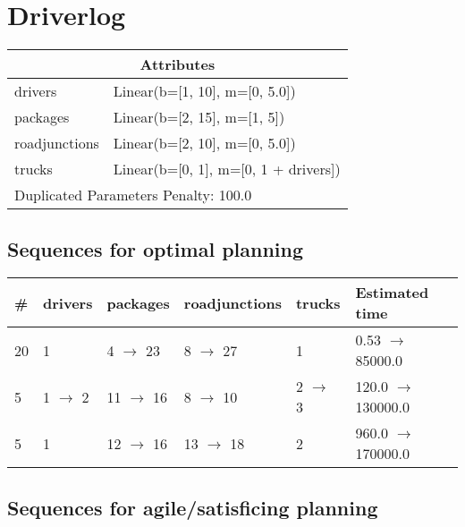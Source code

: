 \documentclass{article}
\begin{document}
                            \newpage \section{Driverlog}
                    \begin{center}
                    \begin{tabular}{@{}p{}p{}@{}}
                    \multicolumn{2}{c}{\bf \large Attributes}\\\midrule
                    drivers & Linear(b=[1, 10], m=[0, 5.0])\\
packages & Linear(b=[2, 15], m=[1, 5])\\
roadjunctions & Linear(b=[2, 10], m=[0, 5.0])\\
trucks & Linear(b=[0, 1], m=[0, 1 + drivers]) \\\midrule
                    \multicolumn{2}{l}{Duplicated Parameters Penalty: 100.0}
                    \end{tabular}
                    \end{center}
                
                            \subsection*{Sequences for optimal planning}

                            \begin{center}
                            \begin{tabular}{@{}l|l|l|l|l|l@{}}
                            \# & drivers & packages & roadjunctions & trucks & Estimated time\\\midrule
                            20&1&4 $\rightarrow$ 23&8 $\rightarrow$ 27&1&0.53 $\rightarrow$ 85000.0\\
5&1 $\rightarrow$ 2&11 $\rightarrow$ 16&8 $\rightarrow$ 10&2 $\rightarrow$ 3&120.0 $\rightarrow$ 130000.0\\
5&1&12 $\rightarrow$ 16&13 $\rightarrow$ 18&2&960.0 $\rightarrow$ 170000.0
                            \end{tabular}
                            \end{center}
                    
                         \subsection*{Sequences for agile/satisficing planning}
\end{document}
